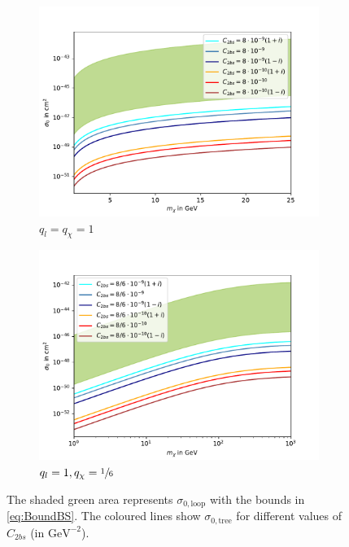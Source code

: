 \begin{figure}
	\centering
	\begin{subfigure}[]{0.8\textwidth}
		\includegraphics[width=\textwidth]{content/graphics/Allgemein11.pdf}
		\caption{$q_l=q_\chi=1$}
		\label{fig:Allg11}
	\end{subfigure}
	\begin{subfigure}[]{0.8\textwidth}
		\includegraphics[width=\textwidth]{content/graphics/Allgemein116.pdf}
		\caption{$q_l=1,q_\chi=\sfrac{1}{6}$}
		\label{fig:Allg116}
	\end{subfigure}
	\caption{The shaded green area represents $\sigma_{0,\text{loop}}$ with the bounds in \eqref{eq:BoundBS}. The coloured lines show $\sigma_{0,\text{tree}}$ for different values of $C_{2bs}$ (in $\si{\giga\electronvolt}^{-2}$).}
	\label{fig:Allgemein}
\end{figure}

